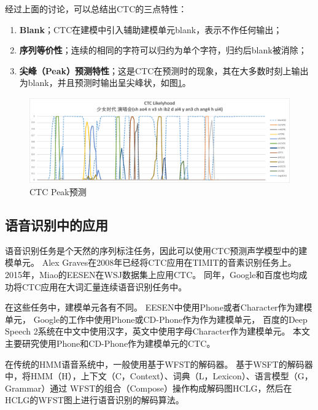 经过上面的讨论，可以总结出CTC的三点特性：
\begin{enumerate}
\item \textbf{Blank}；CTC在建模中引入辅助建模单元blank，表示不作任何输出；
\item \textbf{序列等价性}；连续的相同的字符可以归约为单个字符，归约后blank被消除；
\item \textbf{尖峰（Peak）预测特性}；这是CTC在预测时的现象，其在大多数时刻上输出为blank，并且预测时输出呈尖峰状，如图\ref{fig:peak}。
\end{enumerate}

\begin{figure}
\centering
\includegraphics[width=1.0\textwidth]{figures/chapter4/peak-crop}
\caption{CTC Peak预测}
\label{fig:peak}
\end{figure}

\subsection{语音识别中的应用}

语音识别任务是个天然的序列标注任务，因此可以使用CTC预测声学模型中的建模单元。
Alex Graves在2008年已经将CTC应用在TIMIT的音素识别任务上。
2015年，Miao的EESEN在WSJ数据集上应用CTC。
同年，Google和百度也均成功将CTC应用在大词汇量连续语音识别任务中。

在这些任务中，建模单元各有不同。
EESEN中使用Phone或者Character作为建模单元，
Google的工作中使用Phone或CD-Phone作为作为建模单元，
百度的Deep Speech 2系统在中文中使用汉字，英文中使用字母Character作为建模单元。
本文主要研究使用Phone和CD-Phone作为建模单元的CTC。

在传统的HMM语音系统中，一般使用基于WFST的解码器。
基于WSFT的解码器中，将HMM（H），上下文（C，Context）、词典（L，Lexicon）、语言模型（G，Grammar）通过
WFST的组合（Compose）操作构成解码图HCLG，然后在HCLG的WFST图上进行语音识别的解码算法。

